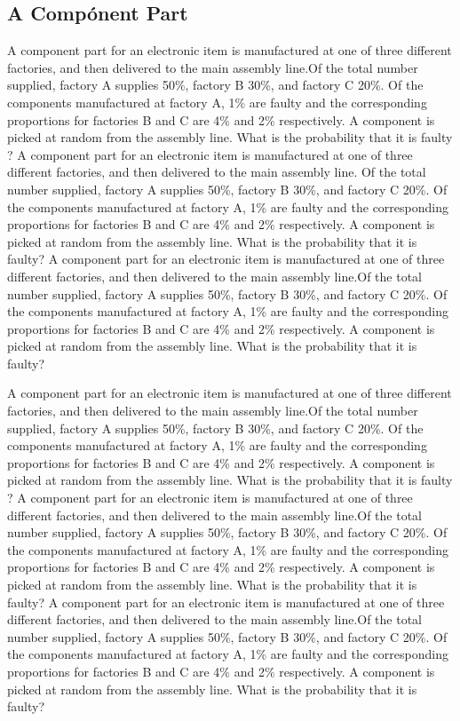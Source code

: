 \subsection{A Comp\'onent Part}
A component part for an electronic item is
manufactured at one of three different factories, and then delivered to
the main assembly line.Of the total number supplied, factory A supplies
50\%, factory B 30\%, and factory C 20\%. Of the components
manufactured at factory A, 1\% are faulty and the corresponding
proportions for factories B and C are 4\% and 2\% respectively. A
component is picked at random from the assembly line. What is the
probability that it is faulty \cite{ilyas2004hsn}? 
A component part for an electronic item is
manufactured at one of three different factories, and then delivered to
the main assembly line. Of the total number supplied, factory A supplies
50\%, factory B 30\%, and factory C 20\%. Of the components
manufactured at factory A, 1\% are faulty and the corresponding
proportions for factories B and C are 4\% and 2\% respectively. A
component is picked at random from the assembly line. What is the
probability that it is faulty? 
A component part for an electronic item is
manufactured at one of three different factories, and then delivered to
the main assembly line.Of the total number supplied, factory A supplies
50\%, factory B 30\%, and factory C 20\%. Of the components
manufactured at factory A, 1\% are faulty and the corresponding
proportions for factories B and C are 4\% and 2\% respectively. A
component is picked at random from the assembly line. What is the
probability that it is faulty? 

A component part for an electronic item is
manufactured at one of three different factories, and then delivered to
the main assembly line.Of the total number supplied, factory A supplies
50\%, factory B 30\%, and factory C 20\%. Of the components
manufactured at factory A, 1\% are faulty and the corresponding
proportions for factories B and C are 4\% and 2\% respectively. A
component is picked at random from the assembly line. What is the
probability that it is faulty \cite{ilyas2004hsn}? 
A component part for an electronic item is
manufactured at one of three different factories, and then delivered to
the main assembly line.Of the total number supplied, factory A supplies
50\%, factory B 30\%, and factory C 20\%. Of the components
manufactured at factory A, 1\% are faulty and the corresponding
proportions for factories B and C are 4\% and 2\% respectively. A
component is picked at random from the assembly line. What is the
probability that it is faulty? 
A component part for an electronic item is
manufactured at one of three different factories, and then delivered to
the main assembly line.Of the total number supplied, factory A supplies
50\%, factory B 30\%, and factory C 20\%. Of the components
manufactured at factory A, 1\% are faulty and the corresponding
proportions for factories B and C are 4\% and 2\% respectively. A
component is picked at random from the assembly line. What is the
probability that it is faulty? 

